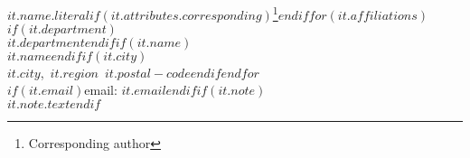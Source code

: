 $it.name.literal$$if(it.attributes.corresponding)$\thanks{Corresponding author}$endif$$for(it.affiliations)$$if(it.department)$\\\small $it.department$$endif$$if(it.name)$\\\small $it.name$$endif$$if(it.city)$\\\small $it.city$,~$it.region$~$it.postal-code$$endif$$endfor$\\\small $if(it.email)$email: $it.email$$endif$$if(it.note)$\\\small $it.note.text$$endif$\\